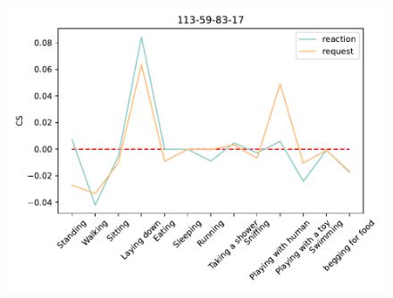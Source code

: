 \begin{figure}[ht]
\begin{minipage}[b]{.3\linewidth}
			\includegraphics[width=0.99\linewidth]{./35word/113-59-83-17.pdf}
		\end{minipage}
		

\end{figure}

